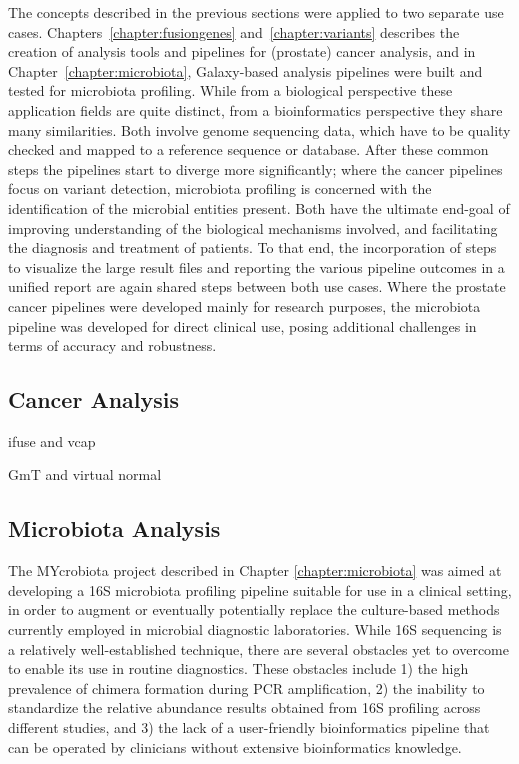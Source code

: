The concepts described in the previous sections were applied to two separate use cases. Chapters~\ref{chapter:fusiongenes} and~\ref{chapter:variants} describes the creation of analysis tools and pipelines for (prostate) cancer analysis, and in Chapter~\ref{chapter:microbiota}, Galaxy-based analysis pipelines were built and tested for microbiota profiling. While from a biological perspective these application fields are quite distinct, from a bioinformatics perspective they share many similarities. Both involve genome sequencing data, which have to be quality checked and mapped to a reference sequence or database. After these common steps the pipelines start to diverge more significantly; where the cancer pipelines focus on variant detection, microbiota profiling is concerned with the identification of the microbial entities present. Both have the ultimate end-goal of improving understanding of the biological mechanisms involved, and facilitating the diagnosis and treatment of patients. To that end, the incorporation of steps to visualize the large result files and reporting the various pipeline outcomes in a unified report are again shared steps between both use cases. Where the prostate cancer pipelines were developed mainly for research purposes, the microbiota pipeline was developed for direct clinical use, posing additional challenges in terms of accuracy and robustness.


\subsection{Cancer Analysis}
ifuse and vcap

GmT and virtual normal


\subsection{Microbiota Analysis}
The MYcrobiota project described in Chapter \ref{chapter:microbiota} was aimed at developing a 16S microbiota profiling pipeline suitable for use in a clinical setting, in order to augment or eventually potentially replace the culture-based methods currently employed in microbial diagnostic laboratories. While 16S sequencing is a relatively well-established technique, there are several obstacles yet to overcome to enable its use in routine diagnostics. These obstacles include 1) the high prevalence of chimera formation during PCR amplification, 2) the inability to standardize the relative abundance results obtained from 16S profiling across different studies, and 3) the lack of a user-friendly bioinformatics pipeline that can be operated by clinicians without extensive bioinformatics knowledge.

